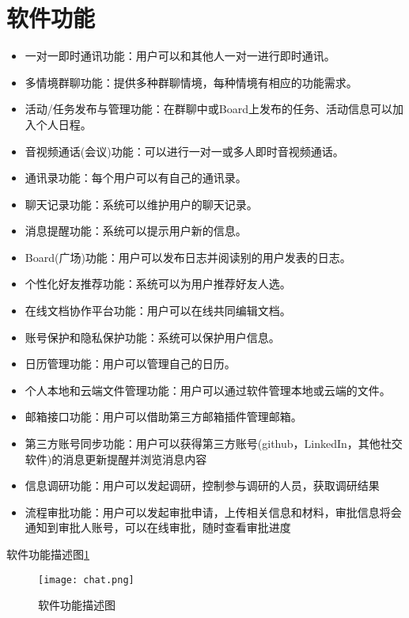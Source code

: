 \section{\color{red}软件功能}
\begin{itemize}
	\item 一对一即时通讯功能：用户可以和其他人一对一进行即时通讯。
	\item 多情境群聊功能：提供多种群聊情境，每种情境有相应的功能需求。
	\item 活动/任务发布与管理功能：在群聊中或Board上发布的任务、活动信息可以加入个人日程。
	\item 音视频通话(会议)功能：可以进行一对一或多人即时音视频通话。
	\item 通讯录功能：每个用户可以有自己的通讯录。
	\item 聊天记录功能：系统可以维护用户的聊天记录。
	\item 消息提醒功能：系统可以提示用户新的信息。
	\item Board(广场)功能：用户可以发布日志并阅读别的用户发表的日志。
	\item 个性化好友推荐功能：系统可以为用户推荐好友人选。
	\item 在线文档协作平台功能：用户可以在线共同编辑文档。
	\item 账号保护和隐私保护功能：系统可以保护用户信息。
	\item 日历管理功能：用户可以管理自己的日历。
	\item 个人本地和云端文件管理功能：用户可以通过软件管理本地或云端的文件。
	\item 邮箱接口功能：用户可以借助第三方邮箱插件管理邮箱。
	\item {\color{red} 第三方账号同步功能：用户可以获得第三方账号(github，LinkedIn，其他社交软件)的消息更新提醒并浏览消息内容}
	\item {\color{red} 信息调研功能：用户可以发起调研，控制参与调研的人员，获取调研结果}
	\item {\color{red} 流程审批功能：用户可以发起审批申请，上传相关信息和材料，审批信息将会通知到审批人账号，可以在线审批，随时查看审批进度}
\end{itemize}
{\color{red} 软件功能描述图}\ref{fig:function}
\newpage
\begin{figure}[ht]
	\centering
	\texttt{[image: chat.png]}\label{tab:classification}
	\caption{\color{red} 软件功能描述图}\label{fig:function}
	\newpage
\end{figure}
\newpage
